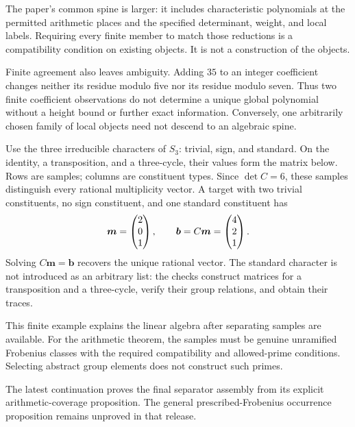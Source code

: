 The paper's common spine is larger: it includes characteristic polynomials at the permitted arithmetic places and the specified determinant, weight, and local labels. Requiring every finite member to match those reductions is a compatibility condition on existing objects. It is not a construction of the objects.

Finite agreement also leaves ambiguity. Adding $35$ to an integer coefficient changes neither its residue modulo five nor its residue modulo seven. Thus two finite coefficient observations do not determine a unique global polynomial without a height bound or further exact information. Conversely, one arbitrarily chosen family of local objects need not descend to an algebraic spine.

Use the three irreducible characters of $S_3$: trivial, sign, and standard. On the identity, a transposition, and a three-cycle, their values form the matrix below. Rows are samples; columns are constituent types.
Since $\det C=6$, these samples distinguish every rational multiplicity vector. A target with two trivial constituents, no sign constituent, and one standard constituent has
\[
\bm m=\begin{pmatrix}2\\0\\1\end{pmatrix},\qquad
\bm b=C\bm m=\begin{pmatrix}4\\2\\1\end{pmatrix}.
\]
Solving $C\bm m=\bm b$ recovers the unique rational vector. The standard character is not introduced as an arbitrary list: the checks construct matrices for a transposition and a three-cycle, verify their group relations, and obtain their traces.

This finite example explains the linear algebra after separating samples are available. For the arithmetic theorem, the samples must be genuine unramified Frobenius classes with the required compatibility and allowed-prime conditions. Selecting abstract group elements does not construct such primes.

The latest continuation proves the final separator assembly from its explicit arithmetic-coverage proposition. The general prescribed-Frobenius occurrence proposition remains unproved in that release.

